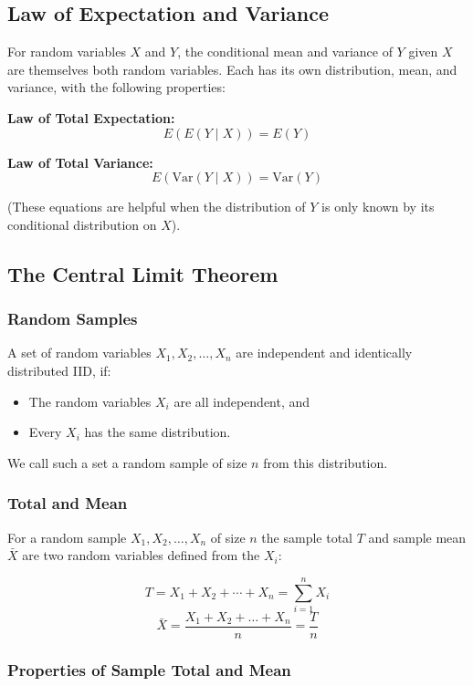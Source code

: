 \subsection{Law of Expectation and Variance}

For random variables $X$ and $Y$, the conditional mean and variance of $Y$ given $X$ are themselves both random variables. Each has its own distribution, mean, and variance, with the following properties:

\textbf{Law of Total Expectation:}
$$ E(E(Y\mid X)) = E(Y)$$

\textbf{Law of Total Variance:}
$$ E(\text{Var}(Y\mid X)) = \text{Var}(Y)$$

(These equations are helpful when the distribution of $Y$ is only known by its conditional distribution on $X$).

\subsection{The Central Limit Theorem}

\subsubsection{Random Samples}

A set of random variables $X_1, X_2, \ldots, X_n$ are independent and identically distributed IID, if:

\begin{itemize}
    \item The random variables $X_i$ are all independent, and
    \item Every $X_i$ has the same distribution.
\end{itemize}

We call such a set a random sample of size $n$ from this distribution.

\subsubsection{Total and Mean}

For a random sample $X_1,X_2,\ldots,X_n$ of size $n$ the sample total $T$ and sample mean $\bar{X}$ are two random variables defined from the $X_i$:

$$ T = X_1 + X_2 + \cdots + X_n = \sum^n_{i=1} X_i $$
$$ \bar{X} = \frac{X_1+X_2+\ldots +X_n}{n} = \frac{T}{n} $$

\subsubsection{Properties of Sample Total and Mean}

